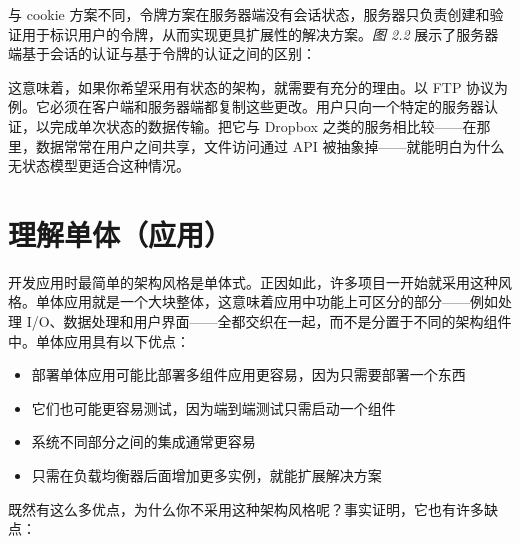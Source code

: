 \label{idx:089}
与 cookie 方案不同，令牌方案在服务器端没有会话状态，服务器只负责创建和验证用于标识用户的令牌，从而实现更具扩展性的解决方案。\emph{图 2.2} 展示了服务器端基于会话的认证与基于令牌的认证之间的区别：


\label{idx:090}
这意味着，如果你希望采用有状态的架构，就需要有充分的理由。以 FTP 协议为例。它必须在客户端和服务器端都复制这些更改。用户只向一个特定的服务器认证，以完成单次状态的数据传输。把它与 Dropbox 之类的服务相比较——在那里，数据常常在用户之间共享，文件访问通过 API 被抽象掉——就能明白为什么无状态模型更适合这种情况。

\section{理解单体（应用）}

开发应用时最简单的架构风格是单体式。正因如此，许多项目一开始就采用这种风格。单体应用就是一个大块整体，这意味着应用中功能上可区分的部分——例如处理 I/O、数据处理和用户界面——全都交织在一起，而不是分置于不同的架构组件中。单体应用具有以下优点：

\begin{itemize}
\label{idx:091}
\item 部署单体应用可能比部署多组件应用更容易，因为只需要部署一个东西
\item 它们也可能更容易测试，因为端到端测试只需启动一个组件
\item 系统不同部分之间的集成通常更容易
\item 只需在负载均衡器后面增加更多实例，就能扩展解决方案
\end{itemize}

既然有这么多优点，为什么你不采用这种架构风格呢？事实证明，它也有许多缺点：

